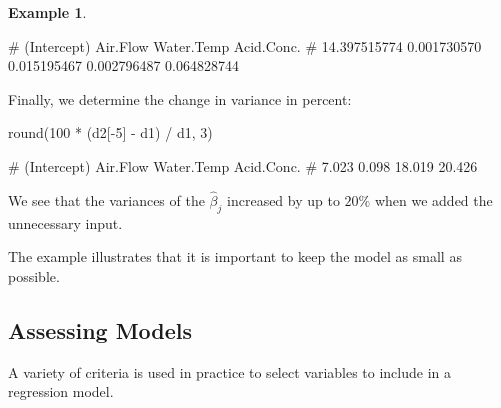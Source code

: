 \documentclass[
  a4paper,
]{article}
\newenvironment{Shaded}{\begin{snugshade}}{\end{snugshade}}
\newcommand{\DecValTok}[1]{\textcolor[rgb]{0.00,0.00,0.81}{#1}}
\newcommand{\FunctionTok}[1]{\textcolor[rgb]{0.00,0.00,0.00}{#1}}
\newcommand{\NormalTok}[1]{#1}
\newcommand{\SpecialCharTok}[1]{\textcolor[rgb]{0.00,0.00,0.00}{#1}}
\theoremstyle{definition}
\theoremstyle{definition}
\newtheorem{example}{Example}[section]
\theoremstyle{definition}
\theoremstyle{definition}
\theoremstyle{remark}
\begin{document}
\begin{example}
\begin{Shaded}
\begin{Highlighting}[]
\NormalTok{\#  (Intercept)     Air.Flow   Water.Temp   Acid.Conc.              }
\NormalTok{\# 14.397515774  0.001730570  0.015195467  0.002796487  0.064828744}
\end{Highlighting}
\end{Shaded}

Finally, we determine the change in variance in percent:

\begin{Shaded}
\begin{Highlighting}[]
\FunctionTok{round}\NormalTok{(}\DecValTok{100} \SpecialCharTok{*}\NormalTok{ (d2[}\SpecialCharTok{{-}}\DecValTok{5}\NormalTok{] }\SpecialCharTok{{-}}\NormalTok{ d1) }\SpecialCharTok{/}\NormalTok{ d1, }\DecValTok{3}\NormalTok{)}
\end{Highlighting}
\end{Shaded}

\begin{Shaded}
\begin{Highlighting}[]
\NormalTok{\# (Intercept)    Air.Flow  Water.Temp  Acid.Conc. }
\NormalTok{\#       7.023       0.098      18.019      20.426}
\end{Highlighting}
\end{Shaded}

We see that the variances of the \(\hat\beta_j\) increased by up to \(20\%\)
when we added the unnecessary input.
\end{example}

The example illustrates that it is important to keep the model as small
as possible.

\hypertarget{criteria}{%
\subsection{Assessing Models}\label{criteria}}

A variety of criteria is used in practice to select variables to include
in a regression model.
\end{document}
